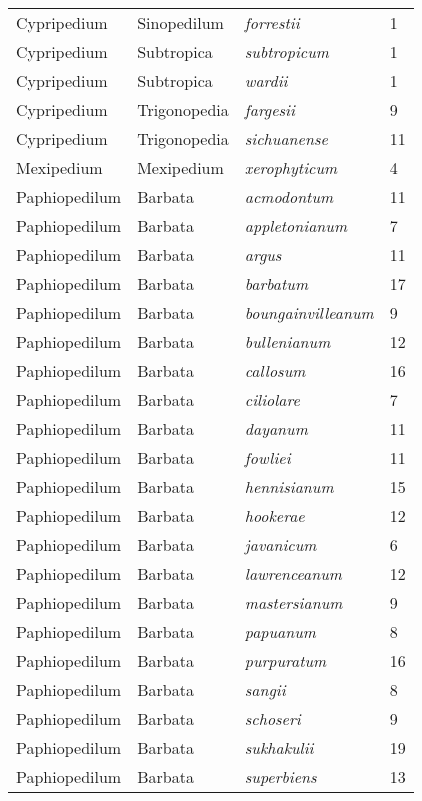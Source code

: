 \documentclass[review,3p,twocolumn]{elsarticle}
\begin{document}
\begin{footnotesize}
\begin{longtable}{llll}
    Cypripedium & Sinopedilum & \textit{forrestii} & 1 \\
    Cypripedium & Subtropica & \textit{subtropicum} & 1 \\
    Cypripedium & Subtropica & \textit{wardii} & 1 \\
    Cypripedium & Trigonopedia & \textit{fargesii} & 9 \\
    Cypripedium & Trigonopedia & \textit{sichuanense} & 11 \\
    Mexipedium & Mexipedium & \textit{xerophyticum} & 4 \\
    Paphiopedilum & Barbata & \textit{acmodontum} & 11 \\
    Paphiopedilum & Barbata & \textit{appletonianum} & 7 \\
    Paphiopedilum & Barbata & \textit{argus} & 11 \\
    Paphiopedilum & Barbata & \textit{barbatum} & 17 \\
    Paphiopedilum & Barbata & \textit{boungainvilleanum} & 9 \\
    Paphiopedilum & Barbata & \textit{bullenianum} & 12 \\
    Paphiopedilum & Barbata & \textit{callosum} & 16 \\
    Paphiopedilum & Barbata & \textit{ciliolare} & 7 \\
    Paphiopedilum & Barbata & \textit{dayanum} & 11 \\
    Paphiopedilum & Barbata & \textit{fowliei} & 11 \\
    Paphiopedilum & Barbata & \textit{hennisianum} & 15 \\
    Paphiopedilum & Barbata & \textit{hookerae} & 12 \\
    Paphiopedilum & Barbata & \textit{javanicum} & 6 \\
    Paphiopedilum & Barbata & \textit{lawrenceanum} & 12 \\
    Paphiopedilum & Barbata & \textit{mastersianum} & 9 \\
    Paphiopedilum & Barbata & \textit{papuanum} & 8 \\
    Paphiopedilum & Barbata & \textit{purpuratum} & 16 \\
    Paphiopedilum & Barbata & \textit{sangii} & 8 \\
    Paphiopedilum & Barbata & \textit{schoseri} & 9 \\
    Paphiopedilum & Barbata & \textit{sukhakulii} & 19 \\
    Paphiopedilum & Barbata & \textit{superbiens} & 13 \\

\end{longtable}
\end{footnotesize}
\end{document}
